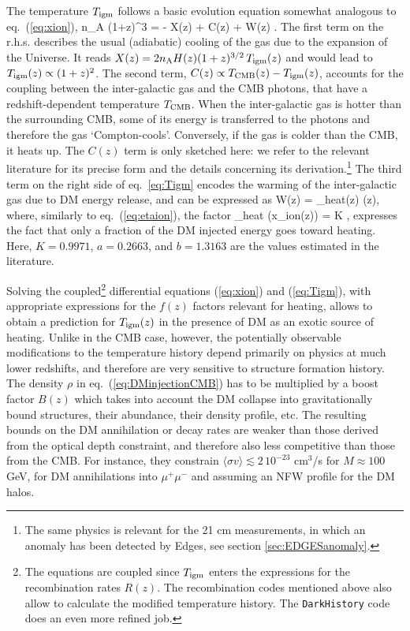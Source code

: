 The temperature $T_{\rm igm}$ follows a basic evolution equation somewhat analogous to eq.~(\ref{eq:xion}),
\beq
\label{eq:Tigm}
n_{\rm A} (1+z)^3  = - X(z) + C(z) + W(z)  .
\eeq
The first term on the r.h.s. describes the usual (adiabatic) cooling of the gas due to the expansion of the Universe. It reads $X(z) = 2 n_{\rm A} H(z) (1+z)^{3/2} \, T_{\rm igm}(z)$ and would lead to $T_{\rm igm}(z) \propto (1+z)^2$. 
The second term, $C(z) \propto T_{\rm CMB}(z) - T_{\rm igm}(z)$, accounts for the coupling between the inter-galactic gas and the CMB photons, that have a redshift-dependent temperature $T_{\rm CMB}$. When the inter-galactic gas is hotter than the surrounding CMB, some of its energy is transferred to the photons and therefore the gas `Compton-cools'. Conversely, if the gas is colder than the CMB, it heats up. 
The $C(z)$ term is only sketched here: we refer to the relevant literature for its precise form and the details concerning its derivation.\footnote{The same physics is relevant for the 21 cm measurements, in which an anomaly has been detected by {\sc Edges}, see section \ref{sec:EDGESanomaly}.}
The third term on the  right side of eq.~\eqref{eq:Tigm} encodes the warming of the inter-galactic gas due to DM energy release, and can be expressed as 
\beq
W(z) =   \eta_{\rm heat}(z) (z),
\eeq
where, similarly to eq.~(\ref{eq:etaion}), the factor
\beq
\eta_{\rm heat} \big(x_{\rm ion}(z)\big) = K ,
\eeq
expresses the fact that only a fraction of the DM injected energy goes toward heating. Here, $K = 0.9971$, $a=0.2663$, and $b=1.3163$ are the values estimated in the literature.


Solving the coupled\footnote{The equations are coupled since $T_{\rm igm}$ enters the expressions for the recombination rates $R(z)$. The recombination codes mentioned above also allow to calculate the modified temperature history. The {\tt DarkHistory} code does an even more refined job.} differential equations (\ref{eq:xion}) and (\ref{eq:Tigm}), with appropriate expressions for the $f(z)$ factors relevant for heating, allows to obtain a prediction for $T_{\rm igm}(z)$ in the presence of DM as an exotic source of heating. 
Unlike in the CMB case, however, the potentially observable modifications to the temperature history depend primarily on physics at much lower redshifts, and therefore are very sensitive to structure formation history. The density $\rho$ in eq.~(\ref{eq:DMinjectionCMB}) has to be multiplied by a boost factor $B(z)$ which takes into account the DM collapse into gravitationally bound structures, their abundance, their density profile, etc. 
The resulting bounds on the DM annihilation or decay rates are weaker than those derived from the  optical depth constraint, and therefore also less competitive than those from the CMB. For instance, they constrain $\langle \sigma v \rangle \lesssim 2 \, 10^{-23}$ cm$^3$/s for $M \approx 100$ GeV, for DM annihilations into $\mu^+\mu^-$ and assuming an NFW profile for the DM halos.





